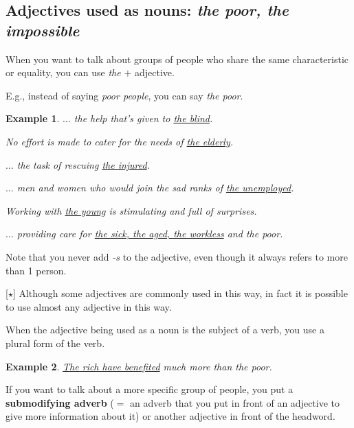 \documentclass[oneside]{book}
\numberwithin{equation}{section}
\newtheorem{example}{Example}[section]
\begin{document}
\subsection{Adjectives used as nouns: \textit{the poor, the impossible}}
\noindent{} When you want to talk about groups of people who share the same characteristic or equality, you can use \textit{the} $+$ adjective.

E.g., instead of saying \textit{poor people}, you can say \textit{the poor}.
\begin{example}
    $\ldots$ the help that's given to \underline{the blind}.
    
    No effort is made to cater for the needs of \underline{the elderly}.
    
    $\ldots$ the task of rescuing \underline{the injured}.
    
    $\ldots$ men and women who would join the sad ranks of \underline{the unemployed}.
    
    Working with \underline{the young} is stimulating and full of surprises.
    
    $\ldots$ providing care for \underline{the sick, the aged, the workless} and \textit{the poor}.
\end{example}
Note that you never add \textit{-s} to the adjective, even though it always refers to more than 1 person.

%
\noindent{} [$\star$] Although some adjectives are commonly used in this way, in fact it is possible to use almost any adjective in this way.

%
\noindent{} When the adjective being used as a noun is the subject of a verb, you use a plural form of the verb.
\begin{example}
    \underline{The rich have benefited} much more than the poor.
\end{example}
%
\noindent{} If you want to talk about a more specific group of people, you put a \textbf{submodifying adverb} ($=$ an adverb that you put in front of an adjective to give more information about it) or another adjective in front of the headword.
\end{document}
